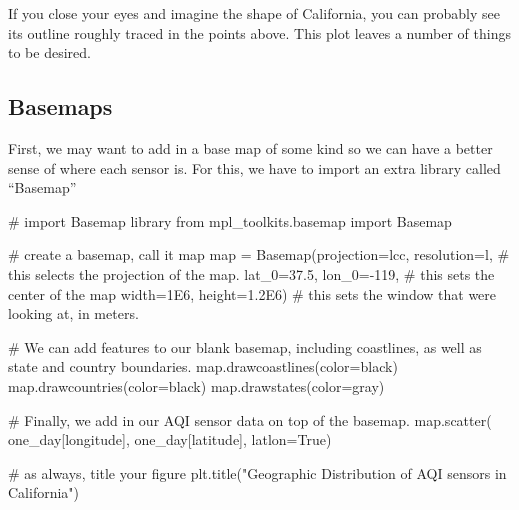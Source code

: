 \documentclass[
  letterpaper,
  DIV=11,
  numbers=noendperiod]{scrreprt}
\newenvironment{Shaded}{\begin{snugshade}}{\end{snugshade}}
\newcommand{\BuiltInTok}[1]{\textcolor[rgb]{0.00,0.23,0.31}{#1}}
\newcommand{\CommentTok}[1]{\textcolor[rgb]{0.37,0.37,0.37}{#1}}
\newcommand{\DecValTok}[1]{\textcolor[rgb]{0.68,0.00,0.00}{#1}}
\newcommand{\FloatTok}[1]{\textcolor[rgb]{0.68,0.00,0.00}{#1}}
\newcommand{\ImportTok}[1]{\textcolor[rgb]{0.00,0.46,0.62}{#1}}
\newcommand{\NormalTok}[1]{\textcolor[rgb]{0.00,0.23,0.31}{#1}}
\newcommand{\OperatorTok}[1]{\textcolor[rgb]{0.37,0.37,0.37}{#1}}
\newcommand{\StringTok}[1]{\textcolor[rgb]{0.13,0.47,0.30}{#1}}
\newcommand{\VariableTok}[1]{\textcolor[rgb]{0.07,0.07,0.07}{#1}}
\begin{document}
If you close your eyes and imagine the shape of California, you can
probably see its outline roughly traced in the points above. This plot
leaves a number of things to be desired.

\hypertarget{basemaps}{%
\subsection{Basemaps}\label{basemaps}}

First, we may want to add in a base map of some kind so we can have a
better sense of where each sensor is. For this, we have to import an
extra library called ``Basemap''

\begin{Shaded}
\begin{Highlighting}[]
\CommentTok{\# import Basemap library}
\ImportTok{from}\NormalTok{ mpl\_toolkits.basemap }\ImportTok{import}\NormalTok{ Basemap}

\CommentTok{\# create a basemap, call it \textquotesingle{}map\textquotesingle{}}
\BuiltInTok{map} \OperatorTok{=}\NormalTok{ Basemap(projection}\OperatorTok{=}\StringTok{\textquotesingle{}lcc\textquotesingle{}}\NormalTok{, resolution}\OperatorTok{=}\StringTok{\textquotesingle{}l\textquotesingle{}}\NormalTok{, }\CommentTok{\# this selects the projection of the map.}
\NormalTok{            lat\_0}\OperatorTok{=}\FloatTok{37.5}\NormalTok{, lon\_0}\OperatorTok{={-}}\DecValTok{119}\NormalTok{, }\CommentTok{\# this sets the center of the map }
\NormalTok{            width}\OperatorTok{=}\FloatTok{1E6}\NormalTok{, height}\OperatorTok{=}\FloatTok{1.2E6}\NormalTok{) }\CommentTok{\# this sets the window that we\textquotesingle{}re looking at, in meters.}

\CommentTok{\# We can add features to our blank basemap, including coastlines, as well as state and country boundaries. }
\BuiltInTok{map}\NormalTok{.drawcoastlines(color}\OperatorTok{=}\StringTok{\textquotesingle{}black\textquotesingle{}}\NormalTok{)}
\BuiltInTok{map}\NormalTok{.drawcountries(color}\OperatorTok{=}\StringTok{\textquotesingle{}black\textquotesingle{}}\NormalTok{)}
\BuiltInTok{map}\NormalTok{.drawstates(color}\OperatorTok{=}\StringTok{\textquotesingle{}gray\textquotesingle{}}\NormalTok{)}

\CommentTok{\# Finally, we add in our AQI sensor data on top of the basemap.}
\BuiltInTok{map}\NormalTok{.scatter(}
\NormalTok{    one\_day[}\StringTok{\textquotesingle{}longitude\textquotesingle{}}\NormalTok{], }
\NormalTok{    one\_day[}\StringTok{\textquotesingle{}latitude\textquotesingle{}}\NormalTok{], }
\NormalTok{    latlon}\OperatorTok{=}\VariableTok{True}\NormalTok{)}

\CommentTok{\# as always, title your figure}
\NormalTok{plt.title(}\StringTok{"Geographic Distribution of AQI sensors in California"}\NormalTok{)}
\end{Highlighting}
\end{Shaded}
\end{document}
